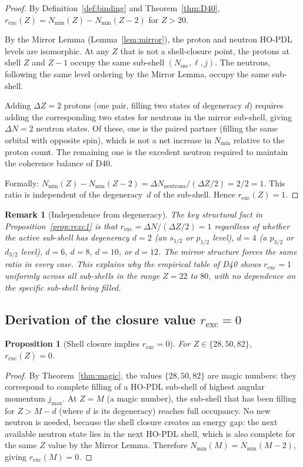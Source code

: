 \documentclass[12pt,a4paper]{article}
\newtheorem{proposition}[theorem]{Proposition}
\newtheorem{remark}[theorem]{Remark}
\newcommand{\Nmin}{N_{\min}}
\newcommand{\rexc}{r_{\mathrm{exc}}}
\begin{document}
\begin{proof}
By Definition~\ref{def:binding} and Theorem~\ref{thm:D40}, $\rexc(Z) = \Nmin(Z) - \Nmin(Z-2)$ for $Z > 20$.

By the Mirror Lemma (Lemma~\ref{lem:mirror}), the proton and neutron HO-PDL levels are isomorphic. At any $Z$ that is not a shell-closure point, the protons at shell $Z$ and $Z-1$ occupy the same sub-shell $(N_{\mathrm{osc}}, \ell, j)$. The neutrons, following the same level ordering by the Mirror Lemma, occupy the same sub-shell.

Adding $\Delta Z = 2$ protons (one pair, filling two states of degeneracy $d$) requires adding the corresponding two states for neutrons in the mirror sub-shell, giving $\Delta N = 2$ neutron states. Of these, one is the paired partner (filling the same orbital with opposite spin), which is not a net increase in $\Nmin$ relative to the proton count. The remaining one is the excedent neutron required to maintain the coherence balance of D40.

Formally: $\Nmin(Z) - \Nmin(Z-2) = \Delta N_{\mathrm{neutrons}}/(\Delta Z/2) = 2/2 = 1$. This ratio is independent of the degeneracy~$d$ of the sub-shell. Hence $\rexc(Z) = 1$.
\end{proof}

\begin{remark}[Independence from degeneracy]
The key structural fact in Proposition~\ref{prop:rexc1} is that $\rexc = \Delta N/(\Delta Z/2) = 1$ regardless of whether the active sub-shell has degeneracy $d = 2$ (an $s_{1/2}$ or $p_{1/2}$ level), $d = 4$ (a $p_{3/2}$ or $d_{3/2}$ level), $d = 6$, $d = 8$, $d = 10$, or $d = 12$. The mirror structure forces the same ratio in every case. This explains why the empirical table of D40 shows $\rexc = 1$ uniformly across all sub-shells in the range $Z = 22$ to $80$, with no dependence on the specific sub-shell being filled.
\end{remark}

\subsection{Derivation of the closure value \texorpdfstring{$\rexc = 0$}{r\_exc = 0}}

\begin{proposition}[Shell closure implies $\rexc = 0$]
\label{prop:rexc0}
For $Z \in \{28, 50, 82\}$, $\rexc(Z) = 0$.
\end{proposition}

\begin{proof}
By Theorem~\ref{thm:magic}, the values $\{28, 50, 82\}$ are magic numbers: they correspond to complete filling of a HO-PDL sub-shell of highest angular momentum $j_{\max}$. At $Z = M$ (a magic number), the sub-shell that has been filling for $Z > M-d$ (where $d$ is its degeneracy) reaches full occupancy. No new neutron is needed, because the shell closure creates an energy gap: the next available neutron state lies in the next HO-PDL shell, which is also complete for the same $Z$ value by the Mirror Lemma. Therefore $\Nmin(M) = \Nmin(M-2)$, giving $\rexc(M) = 0$.
\end{proof}
\end{document}
